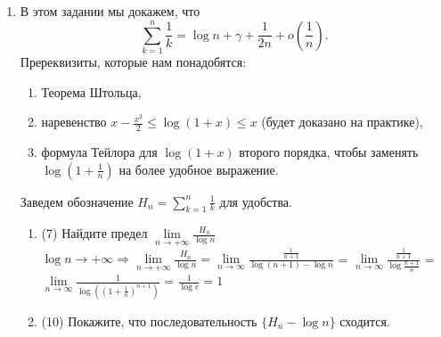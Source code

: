\documentclass[a4paper]{article}
\begin{document}
\renewcommand{\labelenumii}{\arabic{enumii})}
\renewcommand{\labelenumiii}{\roman{enumiii})}




\begin{enumerate}
    
    \item В этом задании мы докажем, что 
    \[
        \sum\limits_{k = 1}^n \frac{1}{k} = \log n + \gamma + \frac{1}{2n} + o\left( \frac{1}{n} \right).
    \]
    Пререквизиты, которые нам понадобятся:
    \begin{enumerate}[label=(\arabic*)]
        \item Теорема Штольца,
        \item наревенство $x-\frac{x^2}{2}\leq \log (1+x)\leq x$ (будет доказано на практике),
        \item формула Тейлора для $\log(1+x)$ второго порядка, чтобы заменять $\log\left(1 + \frac{1}{n}\right)$ на более удобное выражение.
    \end{enumerate}
    Заведем обозначение $H_n = \sum\limits_{k = 1}^n \frac{1}{k}$ для удобства.
    \begin{enumerate}
        \item (7) Найдите предел $\lim\limits_{n\to +\infty}\frac{H_n}{\log n}$\\
        $\log n \to +\infty \Rightarrow \lim\limits_{n\to +\infty}\frac{H_n}{\log n} = \lim\limits_{n\to\infty} \frac{\frac{1}{n+1}}{\log (n+1) - \log n}$ 
        = $\lim\limits_{n\to\infty} \frac{\frac{1}{n+1}}{\log \frac{n+1}{n}}$ = 
        $\lim\limits_{n\to\infty} \frac{1}{\log ((1 + \frac{1}{n})^{n+1})}$ = 
        $\frac{1}{\log e} = 1$
        \item (10) Покажите, что последовательность $\{H_n - \log n\}$ сходится.
        

\end{enumerate}
\end{enumerate}
\end{document}
